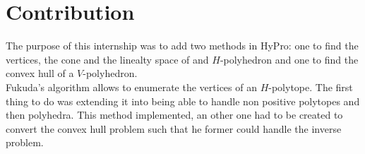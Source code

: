 \section{Contribution}
\label{section_contrib}
The purpose of this internship was to add two methods in HyPro: one to find the vertices, the cone and the linealty space of and $H$-polyhedron and one to find the convex hull of a $V$-polyhedron.\\
Fukuda's algorithm allows to enumerate the vertices of an $H$-polytope. The first thing to do was extending it into being able to handle non positive polytopes and then polyhedra. This method implemented, an other one had to be created to convert the convex hull problem such that he former could handle the inverse problem.

